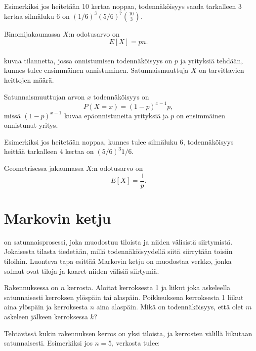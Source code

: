 Esimerkiksi jos heitetään 10 kertaa noppaa,
todennäköisyys saada tarkalleen 3 kertaa silmäluku 6
on $(1/6)^3 (5/6)^7 {10 \choose 3}$.

Binomijakaumassa $X$:n odotusarvo on
\[E[X] = pn.\]
~\\
 kuvaa tilannetta,
jossa onnistumisen todennäköisyys on $p$
ja yrityksiä tehdään, kunnes tulee ensimmäinen
onnistuminen. Satunnaismuuttuja $X$ on
tarvittavien heittojen määrä.

Satunnaismuuttujan arvon $x$ todennäköisyys on
\[P(X=x)=(1-p)^{x-1} p,\]
missä $(1-p)^{x-1}$ kuvaa epäonnistuneita yrityksiä ja
$p$ on ensimmäinen onnistunut yritys.

Esimerkiksi jos heitetään noppaa,
kunnes tulee silmäluku 6, todennäköisyys
heittää tarkalleen 4 kertaa on $(5/6)^3 1/6$.

Geometrisessa jakaumassa $X$:n odotusarvo on
\[E[X]=\frac{1}{p}.\]

\section{Markovin ketju}


 on satunnaisprosessi,
joka muodostuu tiloista ja niiden välisistä siirtymistä.
Jokaisesta tilasta tiedetään, millä todennäköisyydellä
siitä siirrytään toisiin tiloihin.
Luonteva tapa esittää Markovin ketju on
muodostaa verkko, jonka solmut ovat tiloja
ja kaaret niiden välisiä siirtymiä.

\begin{task}
Rakennuksessa on $n$ kerrosta.
Aloitat kerroksesta 1 ja liikut joka askeleella
satunnaisesti kerroksen ylöspäin tai alaspäin.
Poikkeuksena kerroksesta 1 liikut aina ylöspäin
ja kerroksesta $n$ aina alaspäin.
Mikä on todennäköisyys, että olet $m$
askeleen jälkeen kerroksessa $k$?
\end{task}

Tehtävässä kukin rakennuksen kerros
on yksi tiloista, ja kerrosten välillä liikutaan
satunnaisesti.
Esimerkiksi jos $n=5$, verkosta tulee:

